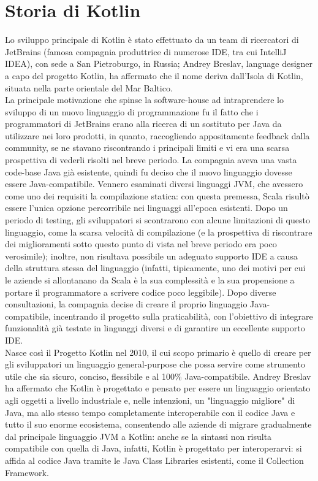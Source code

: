 \section{Storia di Kotlin}
Lo sviluppo principale di Kotlin è stato effettuato da un team di ricercatori di JetBrains (famosa compagnia produttrice di numerose IDE, tra cui IntelliJ IDEA), con sede a San Pietroburgo, in Russia; Andrey Breslav, language designer a capo del progetto Kotlin, ha affermato che il nome deriva dall’Isola di Kotlin, situata nella parte orientale del Mar Baltico.\\
La principale motivazione che spinse la software-house ad intraprendere lo sviluppo di un nuovo linguaggio di programmazione fu il fatto che i programmatori di JetBrains erano alla ricerca di un sostituto per Java da utilizzare nei loro prodotti, in quanto, raccogliendo appositamente feedback dalla community, se ne stavano riscontrando i principali limiti e vi era una scarsa prospettiva di vederli risolti nel breve periodo. La compagnia aveva una vasta code-base Java già esistente, quindi fu deciso che il nuovo linguaggio dovesse essere Java-compatibile. Vennero esaminati diversi linguaggi JVM, che avessero come uno dei requisiti la compilazione statica: con questa premessa, Scala risultò essere l'unica opzione percorribile nei linguaggi all'epoca esistenti. Dopo un periodo di testing, gli sviluppatori si scontrarono con alcune limitazioni di questo linguaggio, come la scarsa velocità di compilazione (e la prospettiva di riscontrare dei miglioramenti sotto questo punto di vista nel breve periodo era poco verosimile); inoltre, non risultava possibile un adeguato supporto IDE a causa della struttura stessa del linguaggio (infatti, tipicamente, uno dei motivi per cui le aziende si allontanano da Scala è la sua complessità e la sua propensione a portare il programmatore a scrivere codice poco leggibile). Dopo diverse consultazioni, la compagnia decise di creare il proprio linguaggio Java-compatibile, incentrando il progetto sulla praticabilità, con l’obiettivo di integrare funzionalità già testate in linguaggi diversi e di garantire un eccellente supporto IDE.\\

Nasce così il Progetto Kotlin nel 2010, il cui scopo primario è quello di creare per gli sviluppatori un linguaggio general-purpose che possa servire come strumento utile che sia sicuro, conciso, flessibile e al 100\% Java-compatibile. Andrey Breslav ha affermato che Kotlin è progettato e pensato per essere un linguaggio orientato agli oggetti a livello industriale e, nelle intenzioni, un "linguaggio migliore" \cite{kotlinOracle} di Java, ma allo stesso tempo completamente interoperabile con il codice Java e tutto il suo enorme ecosistema, consentendo alle aziende di migrare gradualmente dal principale linguaggio JVM a Kotlin: anche se la sintassi non risulta compatibile con quella di Java, infatti, Kotlin è progettato per interoperarvi: si affida al codice Java tramite le Java Class Libraries esistenti, come il Collection Framework. \\

